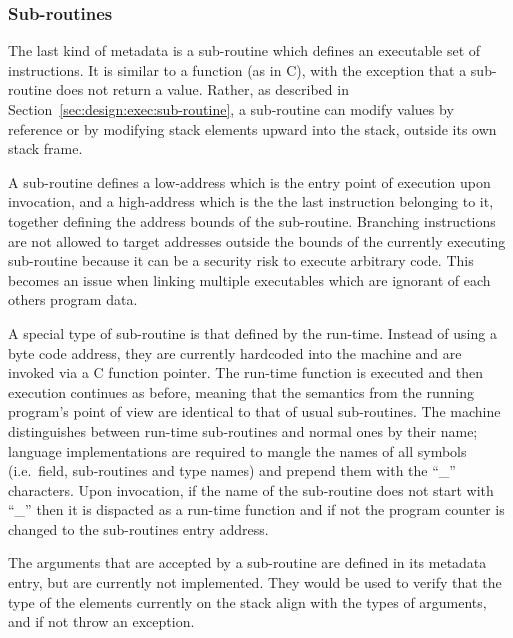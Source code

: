 \subsubsection{Sub-routines}
\label{sec:implementation:meta:sub-routines}

The last kind of metadata is a sub-routine which defines an executable set of
instructions. It is similar to a function (as in C), with the exception that a
sub-routine does not return a value. Rather, as described in
Section~\ref{sec:design:exec:sub-routine}, a sub-routine can modify values by
reference or by modifying stack elements upward into the stack, outside its own
stack frame.

A sub-routine defines a low-address which is the entry point of execution upon
invocation, and a high-address which is the the last instruction belonging to
it, together defining the address bounds of the sub-routine. Branching
instructions are not allowed to target addresses outside the bounds of the
currently executing sub-routine because it can be a security risk to execute
arbitrary code. This becomes an issue when linking multiple executables which
are ignorant of each others program data.

A special type of sub-routine is that defined by the run-time. Instead of using
a byte code address, they are currently hardcoded into the machine and are
invoked via a C function pointer. The run-time function is executed and then
execution continues as before, meaning that the semantics from the running
program's point of view are identical to that of usual sub-routines. The machine
distinguishes between run-time sub-routines and normal ones by their name;
language implementations are required to mangle the names of all symbols
(i.e.~field, sub-routines and type names) and prepend them with the ``\_''
characters. Upon invocation, if the name of the sub-routine does not start with
``\_'' then it is dispacted as a run-time function and if not the program
counter is changed to the sub-routines entry address.

The arguments that are accepted by a sub-routine are defined in its metadata
entry, but are currently not implemented. They would be used to verify that the
type of the elements currently on the stack align with the types of arguments,
and if not throw an exception.

